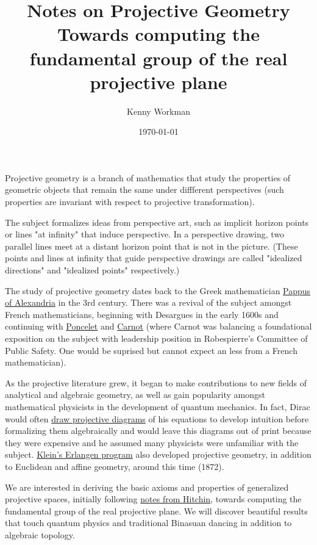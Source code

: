 \documentclass[10pt]{article}
\title{Notes on Projective Geometry \\
	\large Towards computing the fundamental group of the real projective plane}
\author{Kenny Workman}
\date{\today}
\begin{document}
\maketitle

Projective geometry is a branch of mathematics that study
the properties of geometric objects that remain the same
under diffferent perspectives (such properties are invariant with respect to projective
transformation). 

The subject formalizes ideas from perspective art, such as implicit horizon
points or lines "at infinity" that induce perspective. In a perspective drawing, two
parallel lines meet at a distant horizon point that is not in the picture. (These points and
lines at infinity that guide perspective drawings are called "idealized
directions" and "idealized points" respectively.)

The study of projective geometry dates back to the Greek mathematician 
\href{https://en.wikipedia.org/wiki/Pappus_of_Alexandria}{Pappus of Alexandria}
in the 3rd century. There was a revival of the subject amongst French
mathematicians, beginning with Desargues in the early 1600s and continuing with
\href{https://en.wikipedia.org/wiki/Jean-Victor_Poncelet}{Poncelet} and
\href{https://en.wikipedia.org/wiki/Lazare_Carnot}{Carnot} (where Carnot was
balancing a foundational exposition on the subject with leadership position in
Robespierre's Committee of Public Safety. One would be suprised but cannot
expect an less from a French mathematician).

As the projective literature grew, it began to make contributions to new fields
of analytical and algebraic geometry, as well as gain popularity amongst
mathematical physicists in the development of quantum mechanics. In fact,
Dirac would often \href{https://www.nature.com/articles/437323a.pdf}{draw
projective diagrams} of his equations to develop intuition before formalizing
them algebraically and would leave this diagrams out of print because they were
expensive and he assumed many physicists were unfamiliar with the subject.
\href{https://en.wikipedia.org/wiki/Erlangen_program}{Klein's Erlangen program} also developed projective geometry, in addition to Euclidean and affine geometry, around this time (1872).

We are interested in deriving the basic axioms and properties of generalized
projective spaces, initially following \href{https://people.maths.ox.ac.uk/hitchin/files/LectureNotes/Projective_geometry/Chapter_1_Projective_geometry.pdf}{notes from Hitchin}, towards computing the fundamental group of the real
projective plane. We will discover beautiful results that touch quantum physics
and traditional Binasuan dancing in addition to algebraic topology.
\end{document}
